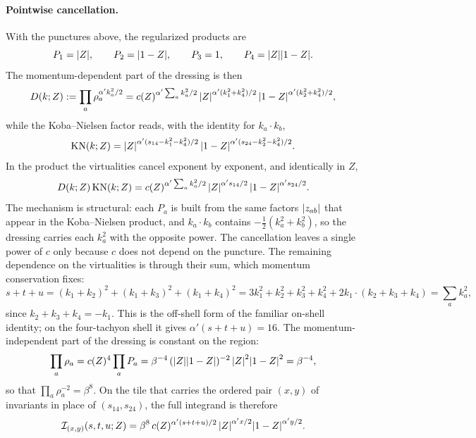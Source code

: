 \paragraph{Pointwise cancellation.}
With the punctures above, the regularized products are
\begin{equation}
  P_1
    = {|Z|},
  \qquad
  P_2
    = {|1 - Z|},
  \qquad
  P_3
    = 1,
  \qquad
  P_4
    = {|Z|} {|1 - Z|}.
\end{equation}
The momentum-dependent part of the dressing is then
\begin{equation}
  D(k; Z)
    := \prod_a \rho_a^{\alpha' k_a^2 / 2}
    = c(Z)^{\alpha' \sum_a k_a^2 / 2} \, {|Z|}^{\alpha' (k_1^2 + k_4^2) / 2} \, {|1 - Z|}^{\alpha' (k_2^2 + k_4^2) / 2},
\end{equation}
while the Koba--Nielsen factor reads, with the identity for $k_a \cdot k_b$,
\begin{equation}
  \mathrm{KN}(k; Z)
    = {|Z|}^{\alpha' (s_{14} - k_1^2 - k_4^2) / 2} \, {|1 - Z|}^{\alpha' (s_{24} - k_2^2 - k_4^2) / 2}.
\end{equation}
In the product the virtualities cancel exponent by exponent, and identically in $Z$,
\begin{equation}
  \label{eq:sl2c:cancel}
  D(k; Z) \, \mathrm{KN}(k; Z)
    = c(Z)^{\alpha' \sum_a k_a^2 / 2} \, {|Z|}^{\alpha' s_{14} / 2} \, {|1 - Z|}^{\alpha' s_{24} / 2}.
\end{equation}
The mechanism is structural: each $P_a$ is built from the same factors ${|z_{ab}|}$ that appear in the Koba--Nielsen product, and $k_a \cdot k_b$ contains $- \frac{1}{2} (k_a^2 + k_b^2)$, so the dressing carries each $k_a^2$ with the opposite power.
The cancellation leaves a single power of $c$ only because $c$ does not depend on the puncture.
The remaining dependence on the virtualities is through their sum, which momentum conservation fixes:
\begin{equation}
  \label{eq:sl2c:sum}
  s + t + u
    = (k_1 + k_2)^2 + (k_1 + k_3)^2 + (k_1 + k_4)^2
    = 3 k_1^2 + k_2^2 + k_3^2 + k_4^2 + 2 k_1 \cdot (k_2 + k_3 + k_4)
    = \sum_a k_a^2,
\end{equation}
since $k_2 + k_3 + k_4 = - k_1$.
This is the off-shell form of the familiar on-shell identity; on the four-tachyon shell it gives $\alpha' (s + t + u) = 16$.
The momentum-independent part of the dressing is constant on the region:
\begin{equation}
  \label{eq:sl2c:product}
  \prod_a \rho_a
    = c(Z)^4 \prod_a P_a
    = \beta^{-4} \, ({|Z|} {|1 - Z|})^{-2} \, {|Z|}^2 {|1 - Z|}^2
    = \beta^{-4},
\end{equation}
so that $\prod_a \rho_a^{-2} = \beta^8$.
On the tile that carries the ordered pair $(x, y)$ of invariants in place of $(s_{14}, s_{24})$, the full integrand is therefore
\begin{equation}
  \label{eq:sl2c:tile-integrand}
  \mathcal I_{(x, y)}(s, t, u; Z)
    = \beta^8 \, c(Z)^{\alpha' (s + t + u) / 2} \, {|Z|}^{\alpha' x / 2} {|1 - Z|}^{\alpha' y / 2}.
\end{equation}

